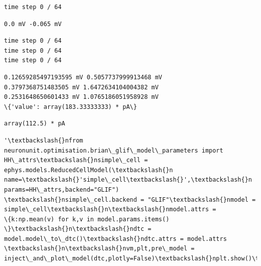 {    \begin{Verbatim}[commandchars=\\\{\}]
time step 0 / 64
    \end{Verbatim}

    \begin{Verbatim}[commandchars=\\\{\}]
0.0 mV -0.065 mV
    \end{Verbatim}

    \begin{Verbatim}[commandchars=\\\{\}]
time step 0 / 64
time step 0 / 64
time step 0 / 64
    \end{Verbatim}

    \begin{Verbatim}[commandchars=\\\{\}]
0.12659285497193595 mV 0.5057737999913468 mV
0.3797368751483505 mV 1.6472634104004382 mV
0.2531648650601433 mV 1.0765186051958928 mV
\{'value': array(183.33333333) * pA\}
    \end{Verbatim}

            \begin{tcolorbox}[breakable, size=fbox, boxrule=.5pt, pad at break*=1mm, opacityfill=0]
\begin{Verbatim}[commandchars=\\\{\}]
array(112.5) * pA
\end{Verbatim}
\end{tcolorbox}
        
            \begin{tcolorbox}[breakable, size=fbox, boxrule=.5pt, pad at break*=1mm, opacityfill=0]
\begin{Verbatim}[commandchars=\\\{\}]
'\textbackslash{}nfrom neuronunit.optimisation.brian\_glif\_model\_parameters import
HH\_attrs\textbackslash{}nsimple\_cell = ephys.models.ReducedCellModel(\textbackslash{}n
name=\textbackslash{}'simple\_cell\textbackslash{}',\textbackslash{}n        params=HH\_attrs,backend="GLIF")
\textbackslash{}nsimple\_cell.backend = "GLIF"\textbackslash{}nmodel = simple\_cell\textbackslash{}n\textbackslash{}nmodel.attrs =
\{k:np.mean(v) for k,v in model.params.items() \}\textbackslash{}n\textbackslash{}ndtc =
model.model\_to\_dtc()\textbackslash{}ndtc.attrs = model.attrs \textbackslash{}n\textbackslash{}nvm,plt,pre\_model =
inject\_and\_plot\_model(dtc,plotly=False)\textbackslash{}nplt.show()\textbackslash{}n'
\end{Verbatim}
\end{tcolorbox}
        
}

